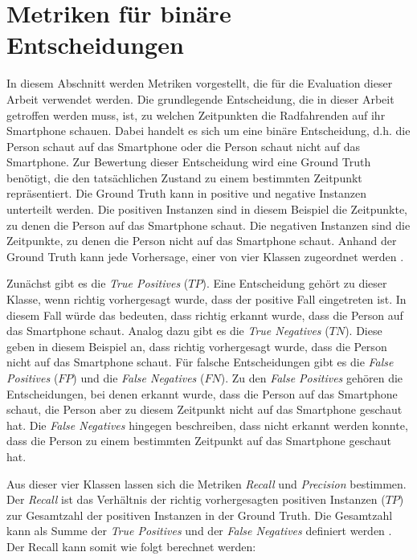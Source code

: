 \section{Metriken für binäre Entscheidungen}

In diesem Abschnitt werden Metriken vorgestellt, die für die Evaluation dieser Arbeit verwendet werden. Die grundlegende Entscheidung, die in dieser Arbeit getroffen werden muss, ist, zu welchen Zeitpunkten die Radfahrenden auf ihr Smartphone schauen. Dabei handelt es sich um eine binäre Entscheidung, d.h. die Person schaut auf das Smartphone oder die Person schaut nicht auf das Smartphone. Zur Bewertung dieser Entscheidung wird eine Ground Truth benötigt, die den tatsächlichen Zustand zu einem bestimmten Zeitpunkt repräsentiert. Die Ground Truth kann in positive und negative Instanzen unterteilt werden. Die positiven Instanzen sind in diesem Beispiel die Zeitpunkte, zu denen die Person auf das Smartphone schaut. Die negativen Instanzen sind die Zeitpunkte, zu denen die Person nicht auf das Smartphone schaut. Anhand der Ground Truth kann jede Vorhersage, einer von vier Klassen zugeordnet werden \cite{diplom:matthes}.

Zunächst gibt es die \textit{True Positives} ($TP$). Eine Entscheidung gehört zu dieser Klasse, wenn richtig vorhergesagt wurde, dass der positive Fall eingetreten ist. In diesem Fall würde das bedeuten, dass richtig erkannt wurde, dass die Person auf das Smartphone schaut. Analog dazu gibt es die \textit{True Negatives} ($TN$). Diese geben in diesem Beispiel an, dass richtig vorhergesagt wurde, dass die Person nicht auf das Smartphone schaut. Für falsche Entscheidungen gibt es die \textit{False Positives} ($FP$) und die \textit{False Negatives} ($FN$). Zu den \textit{False Positives} gehören die Entscheidungen, bei denen erkannt wurde, dass die Person auf das Smartphone schaut, die Person aber zu diesem Zeitpunkt nicht auf das Smartphone geschaut hat. Die \textit{False Negatives} hingegen beschreiben, dass nicht erkannt werden konnte, dass die Person zu einem bestimmten Zeitpunkt auf das Smartphone geschaut hat.

Aus dieser vier Klassen lassen sich die Metriken \textit{Recall} und \textit{Precision} bestimmen. Der \textit{Recall} ist das Verhältnis der richtig vorhergesagten positiven Instanzen ($TP$) zur Gesamtzahl der positiven Instanzen in der Ground Truth. Die Gesamtzahl kann als Summe der \textit{True Positives} und der \textit{False Negatives} definiert werden \cite{diplom:matthes}. Der Recall kann somit wie folgt berechnet werden:

